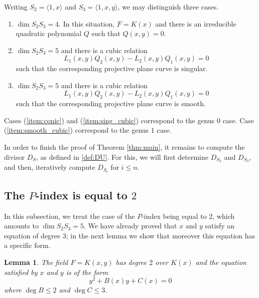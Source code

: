 \documentclass{article}
\theoremstyle{plain}
\newtheorem{lemma}[thm]{Lemma}
\theoremstyle{definition}
\theoremstyle{remark}
\renewcommand{\leq}{\leqslant}
\begin{document}
 Writing $S_2 = \langle 1,x\rangle$ and
$S_3 = \langle 1,x,y \rangle$, we may distinguish three cases.
\begin{enumerate}
  \item\label{item:conic} $\dim S_2S_3 = 4$. In this situation,
    $F=K(x)$ and 
    there is an irreducible quadratic polynomial $Q$ such that $Q(x,y) = 0$.
  \item\label{item:sing_cubic} $\dim S_2S_3 = 5$ and there is a cubic
    relation $$L_1(x,y) Q_2(x,y) - L_2(x,y) Q_1(x,y) = 0$$ such that the
    corresponding projective plane curve is singular.
  \item\label{item:smooth_cubic} $\dim S_2S_3 = 5$ and there is a cubic
    relation $$L_1(x,y) Q_2(x,y) - L_2(x,y) Q_1(x,y) = 0$$ such that the
    corresponding projective plane curve is smooth.
\end{enumerate}
Cases (\ref{item:conic}) and (\ref{item:sing_cubic}) correspond to
the genus $0$ case. Case (\ref{item:smooth_cubic}) correspond to the
genus $1$ case. 

\smallskip

In order to finish the proof of Theorem \ref{thm:main}, it remains to
compute the divisor $D_S$, as defined in  \ref{def:DU}. For this, we
will first determine $D_{S_2}$ and $D_{S_3}$, and then, iteratively
compute  $D_{S_i}$ for $i\leq n$. 

\subsection{The $P$-index is equal to $2$}
\label{sec:Pindex=2}

In this subsection, we treat the case of the $P$-index being equal to
$2$, which amounts to $\dim S_2S_3=5$. We have already proved that $x$
and $y$ satisfy an equation of degree $3$; in the next lemma we show that
moreover this equation has a specific form.

\begin{lemma}\label{lem:deg2}
  The field $F = K(x,y)$ has degree $2$ over $K(x)$ and the equation
  satisfied by $x$ and $y$ is of the form 
\begin{equation}\label{eq:G}
y^2+B(x)y+C(x)=0
\end{equation}
where $\deg B\leq 2$ and $\deg C\leq 3$.
\end{lemma}
\end{document}
